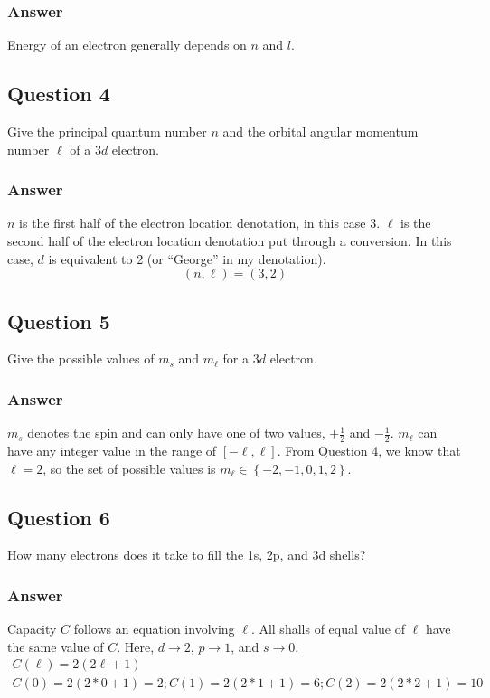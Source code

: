 \documentclass[12pt]{article}
\begin{document}
            \subsubsection{Answer}
                Energy of an electron generally depends on $n$ and $l$. 
            
        \subsection{Question 4}
            Give the principal quantum number $n$ and the orbital angular momentum number $\ell$ of a $3d$ electron.

            \subsubsection{Answer}
                $n$ is the first half of the electron location denotation, in this case $3$.
                $\ell$ is the second half of the electron location denotation put through a conversion.
                In this case, $d$ is equivalent to 2 (or ``George'' in my denotation).
                \[ \boxed{(n,\ell) = (3,2)} \]
            
        \subsection{Question 5}
            Give the possible values of $m_s$ and $m_\ell$ for a $3d$ electron.

            \subsubsection{Answer}
                $m_s$ denotes the spin and can only have one of two values, $+\frac{1}{2}$ and $-\frac{1}{2}$.
                $m_\ell$ can have any integer value in the range of $[-\ell,\ell]$. 
                From Question 4, we know that $\ell = 2$, so the set of possible values is $m_\ell \in \left\{ -2, -1, 0, 1, 2 \right\}$.
        \pagebreak

        \subsection{Question 6}
            How many electrons does it take to fill the 1s, 2p, and 3d shells?

            \subsubsection{Answer}
                Capacity $C$ follows an equation involving $\ell$.
                All shalls of equal value of $\ell$ have the same value of $C$.
                Here, $d \to 2$, $p \to 1$, and $s \to 0$.
                \begin{gather}
                    C(\ell) = 2(2\ell + 1)\\
                    C(0) = 2(2 * 0 + 1) = 2; C(1) = 2(2*1 + 1) = 6; C(2) = 2(2*2 + 1) = 10
                \end{gather}
                
\end{document}
